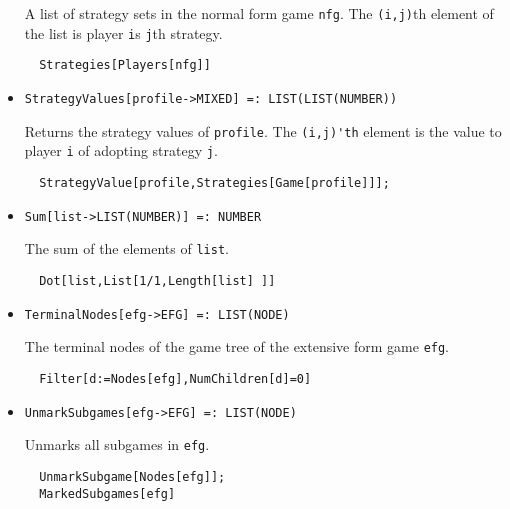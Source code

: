 \begin{itemize}
\bd 
A list of strategy sets in the normal form game \verb+nfg+. The
\verb+(i,j)+th element of the list is player \verb+i+s \verb+j+th
strategy.  
\begin{verbatim}
  Strategies[Players[nfg]]
\end{verbatim} 
\ed

\item{}
\protect \large \begin{verbatim}
StrategyValues[profile->MIXED] =: LIST(LIST(NUMBER)) 
\end{verbatim}\normalsize

\bd 
Returns the strategy values of \verb+profile+.  The
\verb+(i,j)'th+ element is the value to player \verb+i+ of adopting
strategy \verb+j+. 
\begin{verbatim}
  StrategyValue[profile,Strategies[Game[profile]]];
\end{verbatim} 
\ed

\item{}
\protect \large \begin{verbatim}
Sum[list->LIST(NUMBER)] =: NUMBER 
\end{verbatim}\normalsize

\bd 
The sum of the elements of \verb+list+.  
\begin{verbatim}
  Dot[list,List[1/1,Length[list] ]]
\end{verbatim} 
\ed



\item{}
\protect \large \begin{verbatim}
TerminalNodes[efg->EFG] =: LIST(NODE) 
\end{verbatim}\normalsize

\bd 
The terminal nodes of the game tree of the extensive form game \verb+efg+.
\begin{verbatim}
  Filter[d:=Nodes[efg],NumChildren[d]=0]
\end{verbatim} 
\ed


\item{}
\protect \large \begin{verbatim}
UnmarkSubgames[efg->EFG] =: LIST(NODE)
\end{verbatim}\normalsize

\bd 
Unmarks all subgames in \verb+efg+.
\begin{verbatim}
  UnmarkSubgame[Nodes[efg]];
  MarkedSubgames[efg]
\end{verbatim} 
\ed






\end{itemize}

